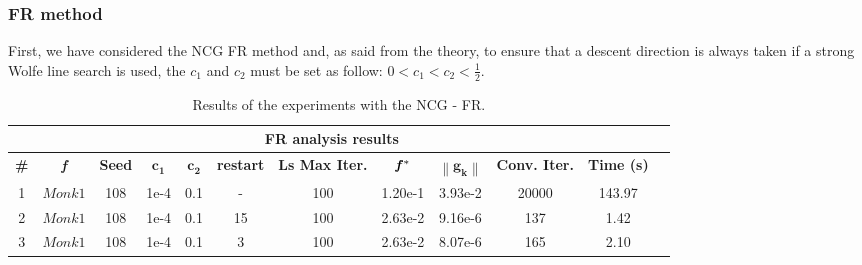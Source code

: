 \documentclass[11pt]{article}
\newcommand{\norm}[1]{\left\lVert#1\right\rVert}
\begin{document}
\subsubsection{FR method}
First, we have considered the NCG FR method and, as said from the theory, to ensure that a descent direction is always taken if a strong Wolfe line search is used, the $c_1$ and $c_2$ must be set as follow: $0 < c_1 < c_2 < \frac{1}{2}$.
\begin{table}[H]
\small
    \centering
    \begin{tabular}{ |c|c|c|c|c|c|c|c|c|c|c|c|}
    \hline
     \multicolumn{11}{|c|}{\textbf{FR analysis results}} \\
      \hline
       \textbf{\#}& \textbf{\textit{f}} & \textbf{Seed} & $\mathbf{c_1}$ & $\mathbf{c_2}$ & \textbf{restart} & \textbf{Ls Max Iter.}& $\mathbf{\textit{\textbf{f}}\,^*}$ & $\mathbf{\norm{\mathbf{g}_k}}$ & \textbf{Conv. Iter.} & \textbf{Time (s)}\\
     \hline
      1 & $Monk1$ & 108 & 1e-4 & 0.1 & - & 100 & 1.20e-1 & 3.93e-2 & 20000 & 143.97 \\
      \hline
      2 & $Monk1$ & 108 & 1e-4 & 0.1 & 15 & 100 & 2.63e-2 & 9.16e-6 & 137 & 1.42\\
      \hline
      3 & $Monk1$ & 108 & 1e-4 & 0.1 & 3 & 100 & 2.63e-2 & 8.07e-6 & 165 & 2.10\\
      \hline
    \end{tabular}
    \caption{Results of the experiments with the NCG - FR.}
    \label{tab:f1_behavior}
\end{table}
\end{document}
